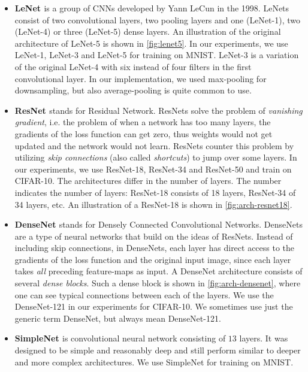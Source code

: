 \begin{itemize}
    \item \textbf{LeNet \cite{lecun_gradient-based_1998}} is a group of CNNs developed by Yann LeCun in the 1998. LeNets consist of two convolutional layers, two pooling layers and one (LeNet-1), two (LeNet-4) or three  (LeNet-5) dense layers. An illustration of the original architecture of LeNet-5 is shown in \cref{fig:lenet5}. In our experiments, we use LeNet-1, LeNet-3 and LeNet-5 for training on MNIST. LeNet-3 is a variation of the original LeNet-4 with six instead of four filters in the first convolutional layer. In our implementation, we used max-pooling for downsampling, but also average-pooling is quite common to use.
    
    \item \textbf{ResNet \cite{he_deep_2016}} stands for Residual Network. ResNets solve the problem of \textit{vanishing gradient}, i.e. the problem of when a network has too many layers, the gradients of the loss function can get zero, thus weights would not get updated and the network would not learn. ResNets counter this problem by utilizing \textit{skip connections} (also called \textit{shortcuts}) to jump over some layers. In our experiments, we use ResNet-18, ResNet-34 and ResNet-50 and train on CIFAR-10. The architectures differ in the number of layers. The number indicates the number of layers: ResNet-18 consists of 18 layers, ResNet-34 of 34 layers, etc. An illustration of a ResNet-18 is shown in \cref{fig:arch-resnet18}.
    
    \item \textbf{DenseNet \cite{huang_densely_2017}} stands for Densely Connected Convolutional Networks. DenseNets are a type of neural networks that build on the ideas of ResNets. Instead of including skip connections, in DenseNets, each layer has direct access to the gradients of the loss function and the original input image, since each layer takes \textit{all} preceding feature-maps as input. A DenseNet architecture consists of several \textit{dense blocks}. Such a dense block is shown in \cref{fig:arch-densenet}, where one can see typical connections between each of the layers. We use the DenseNet-121 in our experiments for CIFAR-10. We sometimes use just the generic term DenseNet, but always mean DenseNet-121.
    
    \item \textbf{SimpleNet \cite{hasanpour_lets_2018}} is convolutional neural network consisting of $13$ layers. It was designed to be simple and reasonably deep and still perform similar to deeper and more complex architectures. We use SimpleNet for training on MNIST.
\end{itemize}

